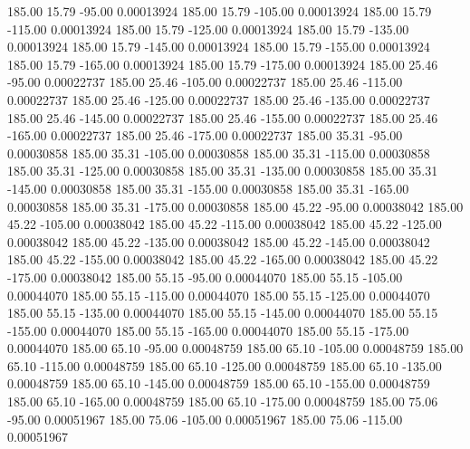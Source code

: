     185.00     15.79    -95.00     0.00013924
    185.00     15.79   -105.00     0.00013924
    185.00     15.79   -115.00     0.00013924
    185.00     15.79   -125.00     0.00013924
    185.00     15.79   -135.00     0.00013924
    185.00     15.79   -145.00     0.00013924
    185.00     15.79   -155.00     0.00013924
    185.00     15.79   -165.00     0.00013924
    185.00     15.79   -175.00     0.00013924
    185.00     25.46    -95.00     0.00022737
    185.00     25.46   -105.00     0.00022737
    185.00     25.46   -115.00     0.00022737
    185.00     25.46   -125.00     0.00022737
    185.00     25.46   -135.00     0.00022737
    185.00     25.46   -145.00     0.00022737
    185.00     25.46   -155.00     0.00022737
    185.00     25.46   -165.00     0.00022737
    185.00     25.46   -175.00     0.00022737
    185.00     35.31    -95.00     0.00030858
    185.00     35.31   -105.00     0.00030858
    185.00     35.31   -115.00     0.00030858
    185.00     35.31   -125.00     0.00030858
    185.00     35.31   -135.00     0.00030858
    185.00     35.31   -145.00     0.00030858
    185.00     35.31   -155.00     0.00030858
    185.00     35.31   -165.00     0.00030858
    185.00     35.31   -175.00     0.00030858
    185.00     45.22    -95.00     0.00038042
    185.00     45.22   -105.00     0.00038042
    185.00     45.22   -115.00     0.00038042
    185.00     45.22   -125.00     0.00038042
    185.00     45.22   -135.00     0.00038042
    185.00     45.22   -145.00     0.00038042
    185.00     45.22   -155.00     0.00038042
    185.00     45.22   -165.00     0.00038042
    185.00     45.22   -175.00     0.00038042
    185.00     55.15    -95.00     0.00044070
    185.00     55.15   -105.00     0.00044070
    185.00     55.15   -115.00     0.00044070
    185.00     55.15   -125.00     0.00044070
    185.00     55.15   -135.00     0.00044070
    185.00     55.15   -145.00     0.00044070
    185.00     55.15   -155.00     0.00044070
    185.00     55.15   -165.00     0.00044070
    185.00     55.15   -175.00     0.00044070
    185.00     65.10    -95.00     0.00048759
    185.00     65.10   -105.00     0.00048759
    185.00     65.10   -115.00     0.00048759
    185.00     65.10   -125.00     0.00048759
    185.00     65.10   -135.00     0.00048759
    185.00     65.10   -145.00     0.00048759
    185.00     65.10   -155.00     0.00048759
    185.00     65.10   -165.00     0.00048759
    185.00     65.10   -175.00     0.00048759
    185.00     75.06    -95.00     0.00051967
    185.00     75.06   -105.00     0.00051967
    185.00     75.06   -115.00     0.00051967
